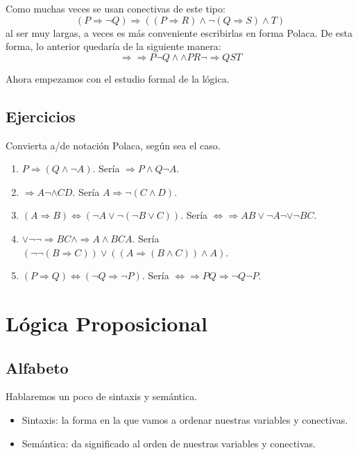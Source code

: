 \documentclass[12pt]{report}
\theoremstyle{largebreak}
\begin{document}
    Como muchas veces se usan conectivas de este tipo:
    \begin{equation*}
        (P\Rightarrow \neg Q)\Rightarrow((P\Rightarrow R)\land\neg(Q\Rightarrow S)\land T)
    \end{equation*}
    al ser muy largas, a veces es más conveniente escribirlas en forma Polaca. De esta forma, lo anterior quedaría de la siguiente manera:
    \begin{equation*}
        \Rightarrow\Rightarrow P\neg Q\land\land PR\neg\Rightarrow Q S T 
    \end{equation*}

    Ahora empezamos con el estudio formal de la lógica.

    \section{Ejercicios}

    Convierta a/de notación Polaca, según sea el caso.

    \begin{enumerate}
        \item $P\Rightarrow(Q\land\neg A)$. Sería $\Rightarrow P\land Q \neg A$.
        \item $\Rightarrow  A\neg\land CD$. Sería $A\Rightarrow \neg(C\land D)$.
        \item $(A\Rightarrow B)\iff (\neg A\lor \neg(\neg B\lor C))$. Sería $\iff \Rightarrow A B \lor \neg A \neg \lor \neg B C$.
        \item $\lor\neg\neg\Rightarrow B C\land\Rightarrow A\land BCA$. Sería $(\neg\neg(B\Rightarrow C))\lor((A\Rightarrow (B\land C))\land A)$.
        \item $(P\Rightarrow Q)\iff (\neg Q\Rightarrow\neg P)$. Sería $\iff \Rightarrow P Q \Rightarrow \neg Q \neg P$.
    \end{enumerate}

    \chapter{Lógica Proposicional}

    \section{Alfabeto}

    Hablaremos un poco de sintaxis y semántica.

    \begin{itemize}
        \item Sintaxis: la forma en la que vamos a ordenar nuestras variables y conectivas.
        \item Semántica: da significado al orden de nuestras variables y conectivas.
    \end{itemize}
\end{document}
